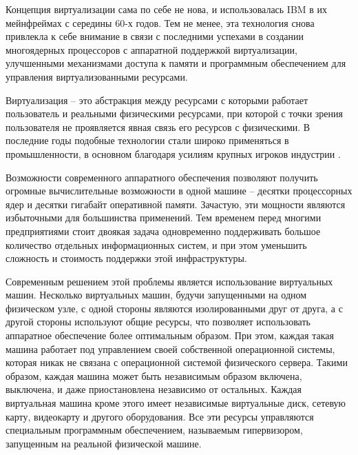\intro

Концепция виртуализации сама по себе не нова, и использовалась IBM в их мейнфреймах
с середины 60-х годов. Тем не менее, эта технология снова привлекла к себе внимание
в связи с последними успехами в создании многоядерных процессоров с аппаратной
поддержкой виртуализации, улучшенными механизмами доступа к памяти и 
программным обеспечением для управления виртуализованными ресурсами.

Виртуализация -- это абстракция между ресурсами с которыми работает пользователь
и реальными физическими ресурсами, при которой с точки зрения пользователя 
не проявляется явная связь его ресурсов с физическими. В последние годы подобные технологии
стали широко применяться в промышленности, в основном благодаря усилиям крупных
игроков индустрии \cite{website:oracle-vt}\cite{website:microsoft-vt}\cite{website:redhat-vt}.
\cite{Carapinha:2009:NVV:1592648.1592660}

Возможности современного аппаратного обеспечения позволяют получить огромные
вычислительные возможности в одной машине -- десятки процессорных ядер и десятки гигабайт оперативной памяти. Зачастую, эти мощности являются избыточными для большинства
применений. Тем временем перед многими предприятиями стоит двоякая задача
одновременно поддерживать большое количество отдельных информационных систем, 
и при этом уменьшить сложность и стоимость поддержки этой инфраструктуры.

Современным решением этой проблемы является использование виртуальных машин.
Несколько виртуальных машин, будучи запущенными на одном физическом узле, 
с одной стороны являются изолированными друг от друга, а с другой стороны используют
общие ресурсы, что позволяет использовать аппаратное обеспечение более оптимальным образом.
При этом, каждая такая машина работает под управлением своей собственной операционной 
системы, которая никак не связана с операционной системой физического сервера.
Такими образом, каждая машина может быть независимым образом включена, выключена,
и даже приостановлена независимо от остальных. Каждая виртуальная машина кроме этого 
имеет независимые виртуальные диск, сетевую карту, видеокарту и другого оборудования.
Все эти ресурсы управляются специальным программным обеспечением, называемым 
гипервизором, запущенным на реальной физической машине.
\cite{Kamoun:2009:VDW:1595422.1595424}

